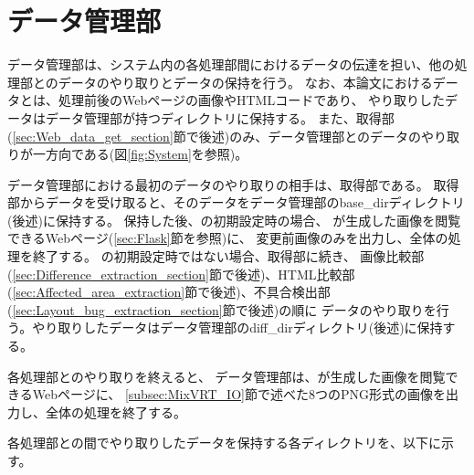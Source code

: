 \section{データ管理部}\label{sec:data_admin_section}
データ管理部は、システム内の各処理部間におけるデータの伝達を担い、他の処理部とのデータのやり取りとデータの保持を行う。
なお、本論文におけるデータとは、処理前後のWebページの画像やHTMLコードであり、
やり取りしたデータはデータ管理部が持つディレクトリに保持する。
また、取得部(\ref{sec:Web_data_get_section}節で後述)のみ、データ管理部とのデータのやり取りが一方向である(図\ref{fig:System}を参照)。
\par
データ管理部における最初のデータのやり取りの相手は、取得部である。
取得部からデータを受け取ると、そのデータをデータ管理部のbase\_dirディレクトリ(後述)に保持する。
保持した後、\toolName の初期設定時の場合、
\toolName が生成した画像を閲覧できるWebページ(\ref{sec:Flask}節を参照)に、
変更前画像のみを出力し、全体の処理を終了する。
\toolName の初期設定時ではない場合、取得部に続き、
画像比較部(\ref{sec:Difference_extraction_section}節で後述)、HTML比較部(\ref{sec:Affected_area_extraction}節で後述)、不具合検出部(\ref{sec:Layout_bug_extraction_section}節で後述)の順に
データのやり取りを行う。やり取りしたデータはデータ管理部のdiff\_dirディレクトリ(後述)に保持する。
\par
各処理部とのやり取りを終えると、
データ管理部は、\toolName が生成した画像を閲覧できるWebページに、
\ref{subsec:MixVRT_IO}節で述べた8つのPNG形式の画像を出力し、全体の処理を終了する。
\par
各処理部との間でやり取りしたデータを保持する各ディレクトリを、以下に示す。
